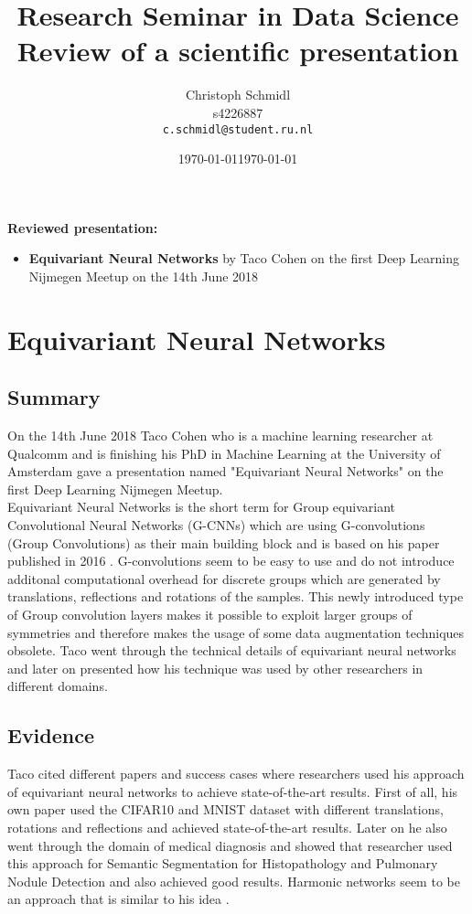 \documentclass[a4paper]{article}
\title{Research Seminar in Data Science\\Review of a scientific presentation}
\author{
  Christoph Schmidl\\ s4226887\\      \texttt{c.schmidl@student.ru.nl}
}
\date{\today}
\date{\today}
\begin{document}
\maketitle

\textbf{Reviewed presentation:}

\begin{itemize}
	\item \textbf{Equivariant Neural Networks} by Taco Cohen on the first Deep Learning Nijmegen Meetup on the 14th June 2018
\end{itemize}


\section{Equivariant Neural Networks}

\subsection{Summary}

On the 14th June 2018 Taco Cohen who is a machine learning researcher at Qualcomm and is finishing his PhD in Machine Learning at the University of Amsterdam gave a presentation named "Equivariant Neural Networks" on the first Deep Learning Nijmegen Meetup.\\ 
Equivariant Neural Networks is the short term for Group equivariant Convolutional Neural Networks (G-CNNs) which are using G-convolutions (Group Convolutions) as their main building block and is based on his paper published in 2016 \cite{cohen2016group}. G-convolutions seem to be easy to use and do not introduce additonal computational overhead for discrete groups which are generated by translations, reflections and rotations of the samples. This newly introduced type of Group convolution layers makes it possible to exploit larger groups of symmetries and therefore makes the usage of some data augmentation techniques obsolete. Taco went through the technical details of equivariant neural networks and later on presented how his technique was used by other researchers in different domains.\\


\subsection{Evidence}

Taco cited different papers and success cases where researchers used his approach of equivariant neural networks to achieve state-of-the-art results. First of all, his own paper \cite{cohen2016group} used the CIFAR10 and MNIST dataset with different translations, rotations and reflections and achieved state-of-the-art results. Later on he also went through the domain of medical diagnosis and showed that researcher used this approach for Semantic Segmentation for Histopathology \cite{winkens2018improved} and Pulmonary Nodule Detection \cite{winkels20183d} and also achieved good results. Harmonic networks seem to be an approach that is similar to his idea \cite{worrall2017harmonic}. 
\end{document}
